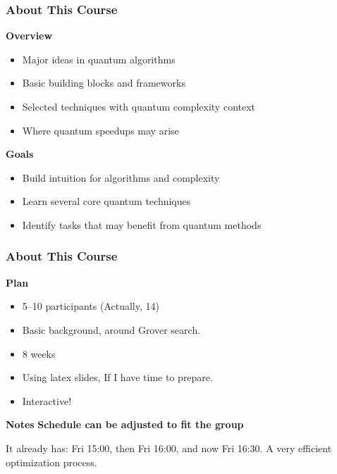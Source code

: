 \documentclass[xcolor=table]{beamer}
\theoremstyle{remark}
\theoremstyle{plain}
\def\\{ }%
\begin{document}
\begin{frame}
  \frametitle{About This Course}
  {\large \textbf{Overview}}

  \vspace{0.6em}
  \begin{itemize}
    \item Major ideas in quantum algorithms
    \item Basic building blocks and frameworks
    \item Selected techniques with quantum complexity context
    \item Where quantum speedups may arise
  \end{itemize}

  \vspace{0.8em}

  {\large \textbf{Goals}}

  \vspace{0.6em}
  \begin{itemize}
    \item Build intuition for algorithms and complexity
    \item Learn several core quantum techniques
    \item Identify tasks that may benefit from quantum methods
  \end{itemize}
\end{frame}

\begin{frame}
  \frametitle{About This Course}
  {\large \textbf{Plan}}

  \vspace{0.5em}
  \begin{itemize}
    \item 5--10 participants (Actually, 14)
    \item Basic background, around Grover search.
    \item 8 weeks
    \item Using latex slides, If I have time to prepare.
    \item Interactive!
  \end{itemize}

  \vspace{0.8em}

  {\large \textbf{Notes}}
  \vspace{1em}
  \textbf{Schedule can be adjusted to fit the group}
  \vspace{0.5em}

  {\small It already has: Fri 15:00, then Fri 16:00, and now Fri 16:30. \\ A very efficient optimization process.}
\end{frame}
\end{document}
